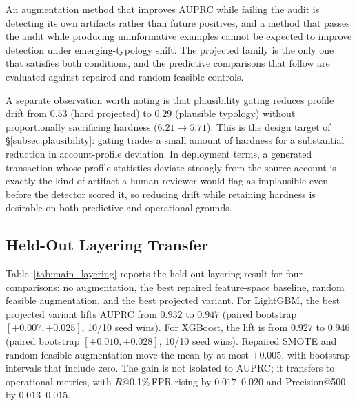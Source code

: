 \documentclass[sigconf,review,anonymous]{acmart}
\begin{document}
An augmentation method that improves AUPRC while failing the audit is
detecting its own artifacts rather than future positives, and a method that
passes the audit while producing uninformative examples cannot be expected to
improve detection under emerging-typology shift. The projected family is the
only one that satisfies both conditions, and the predictive comparisons that
follow are evaluated against repaired and random-feasible controls.

A separate observation worth noting is that plausibility gating reduces
profile drift from $0.53$ (hard projected) to $0.29$ (plausible typology)
without proportionally sacrificing hardness ($6.21\!\to\!5.71$). This is the
design target of \S\ref{subsec:plausibility}: gating trades a small amount of
hardness for a substantial reduction in account-profile deviation. In
deployment terms, a generated transaction whose profile statistics deviate
strongly from the source account is exactly the kind of artifact a
human reviewer would flag as implausible even before the detector scored it,
so reducing drift while retaining hardness is desirable on both predictive
and operational grounds.

\subsection{Held-Out Layering Transfer}
\label{subsec:layering}

Table~\ref{tab:main_layering} reports the held-out layering result for four
comparisons: no augmentation, the best repaired feature-space baseline, random
feasible augmentation, and the best projected variant. For LightGBM, the best
projected variant lifts AUPRC from $0.932$ to $0.947$ (paired bootstrap
$[+0.007,+0.025]$, 10/10 seed wins). For XGBoost, the lift is from $0.927$ to
$0.946$ (paired bootstrap $[+0.010,+0.028]$, 10/10 seed wins). Repaired SMOTE
and random feasible augmentation move the mean by at most $+0.005$, with
bootstrap intervals that include zero. The gain is not isolated to AUPRC; it
transfers to operational metrics, with $R$@0.1\%\,FPR rising by
$0.017$--$0.020$ and Precision@500 by $0.013$--$0.015$.
\end{document}
